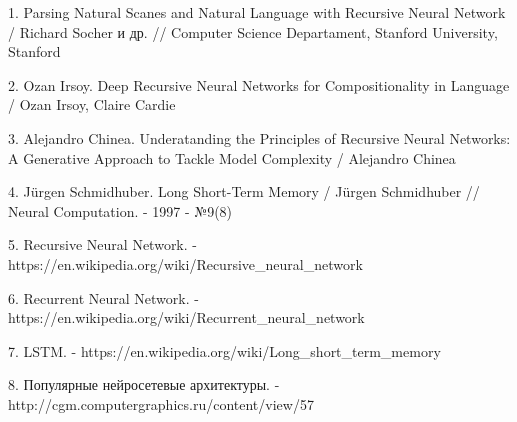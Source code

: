 \documentclass[14pt]{article}
\begin{document}
\pagebreak


\LARGE\bibname

\large
1. Parsing Natural Scanes and Natural Language with Recursive Neural Network / Richard Socher и др. // Computer Science Departament, Stanford University, Stanford


2. Ozan Irsoy. Deep Recursive Neural Networks for Compositionality in Language / Ozan Irsoy, Claire Cardie


3. Alejandro Chinea. Underatanding the Principles of Recursive Neural Networks: A Generative Approach to Tackle Model Complexity / Alejandro Chinea


4. Jürgen Schmidhuber. Long Short-Term Memory / Jürgen Schmidhuber // Neural Computation. - 1997 - №9(8)


5. Recursive Neural Network. - https://en.wikipedia.org/wiki/Recursive\_neural\_network


6. Recurrent Neural Network. - https://en.wikipedia.org/wiki/Recurrent\_neural\_network


7. LSTM. - https://en.wikipedia.org/wiki/Long\_short\_term\_memory


8. Популярные нейросетевые архитектуры. - http://cgm.computergraphics.ru/content/view/57
\end{document}
